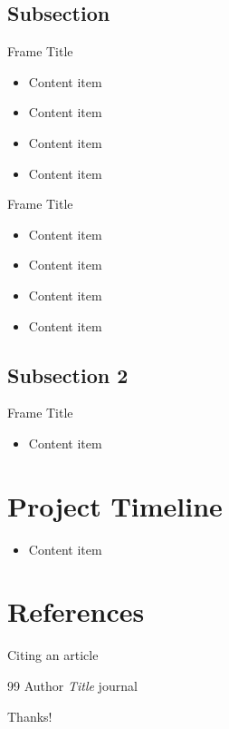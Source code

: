 \documentclass[aspectratio=169]{beamer} %
\begin{document}
\subsection{Subsection}

\begin{frame}{Frame Title}
    \begin{itemize}
        \item Content item
        \item Content item
        \item Content item
        \item Content item
    \end{itemize}
\end{frame}

\begin{frame}{Frame Title}
    \begin{itemize}
        \item Content item
        \item Content item
        \item Content item
        \item Content item
    \end{itemize}
\end{frame}
\subsection{Subsection 2}

\begin{frame}{Frame Title}
    \begin{itemize}
        \item Content item
    \end{itemize}
\end{frame}

\section{Project Timeline}
\begin{frame}
    \begin{itemize}
        \item Content item
    \end{itemize}
\end{frame}


\section{References}

\begin{frame}
Citing an article \cite{article1} 
     \begin{thebibliography}{99}
        Author
        \emph{Title}
        journal
    \end{thebibliography}
\end{frame}

\begin{frame}
    \begin{center}
        {\Huge\calligra Thanks!}
    \end{center}
\end{frame}
\end{document}
